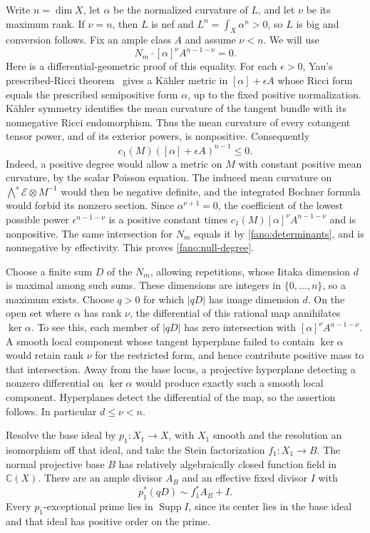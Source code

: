 Write $n=\dim X$, let $\alpha$ be the normalized curvature of $L$,
and let $\nu$ be its maximum rank.  If $\nu=n$, then $L$ is nef
and $L^n=\int_X\alpha^n>0$, so $L$ is big and conversion follows.
Fix an ample class $A$ and assume $\nu<n$.  We will use
\begin{equation}\label{fano:null-degree}
 N_m\cdot[\alpha]^\nu A^{n-1-\nu}=0.
\end{equation}
Here is a differential-geometric proof of this equality.  For each
$\epsilon>0$, Yau's prescribed-Ricci theorem~\cite{Yau1978} gives a
K\"ahler metric in $[\alpha]+\epsilon A$ whose Ricci form equals
the prescribed semipositive form $\alpha$, up to the fixed positive
normalization.  K\"ahler symmetry
identifies the mean curvature of the tangent bundle with its
nonnegative Ricci endomorphism.  Thus the mean curvature of every
cotangent tensor power, and of its exterior powers, is nonpositive.
Consequently
\[
 c_1(M)([\alpha]+\epsilon A)^{n-1}\leq0.
\]
Indeed, a positive degree would allow a metric on $M$ with constant
positive mean curvature, by the scalar Poisson equation.  The induced
mean curvature on
$\bigwedge^s\mathcal E\otimes M^{-1}$ would then be
negative definite, and the integrated Bochner formula would forbid
its nonzero section.  Since $\alpha^{\nu+1}=0$, the coefficient of
the lowest possible power $\epsilon^{n-1-\nu}$ is a positive
constant times $c_1(M)[\alpha]^\nu A^{n-1-\nu}$ and is nonpositive.
The same intersection for $N_m$ equals it by
\eqref{fano:determinants}, and is nonnegative by effectivity.  This
proves \eqref{fano:null-degree}.

Choose a finite sum $D$ of the $N_m$, allowing repetitions, whose
Iitaka dimension $d$ is maximal among such sums.  These dimensions
are integers in $\{0,\ldots,n\}$, so a maximum exists.  Choose
$q>0$ for which $|qD|$ has image dimension $d$.  On the open set
where $\alpha$ has rank $\nu$, the differential of this rational
map annihilates $\ker\alpha$.  To see this, each member of $|qD|$
has zero intersection with $[\alpha]^\nu A^{n-1-\nu}$.  A smooth
local component whose tangent hyperplane failed to contain
$\ker\alpha$ would retain rank $\nu$ for the restricted form,
and hence contribute positive mass to that intersection.  Away from
the base locus, a projective hyperplane detecting a nonzero
differential on $\ker\alpha$ would produce exactly such a smooth
local component.  Hyperplanes detect the differential of the map,
so the assertion follows.  In particular $d\leq\nu<n$.

Resolve the base ideal by $p_1:X_1\to X$, with $X_1$ smooth and the
resolution an isomorphism off that ideal, and take the Stein
factorization $f_1:X_1\to B$.  The normal projective base $B$ has
relatively algebraically closed function field in $\mathbb C(X)$.
There are an ample divisor $A_B$ and an effective fixed divisor $I$
with
\begin{equation}\label{fano:fixed-free}
 p_1^*(qD)\sim f_1^*A_B+I.
\end{equation}
Every $p_1$-exceptional prime lies in $\operatorname{Supp}I$, since
its center lies in the base ideal and that ideal has positive order
on the prime.

